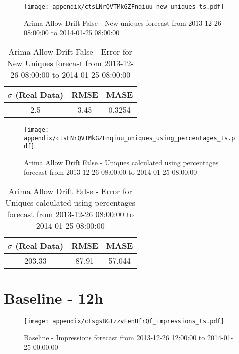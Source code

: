 \begin{figure}[H] \begin{center} \leavevmode
\texttt{[image: appendix/ctsLNrQVTMkGZFnqiuu\_new\_uniques\_ts.pdf]} \caption{
Arima Allow Drift False - New uniques forecast from 2013-12-26 08:00:00 to 2014-01-25 08:00:00} \label{fig:appendix/ctsLNrQVTMkGZFnqiuu_new_uniques_ts.pdf} \end{center}
\end{figure}

\begin{table}[H]
\centering
\footnotesize
\begin{tabular}{ccc}
$\sigma$ (Real Data) & RMSE & MASE   \\ \hline
2.5 & 3.45 & 0.3254 \\
\end{tabular}

\vspace{0.5cm}

\caption{
Arima Allow Drift False - Error for New Uniques forecast from 2013-12-26 08:00:00 to 2014-01-25 08:00:00}
\end{table}

\begin{figure}[H] \begin{center} \leavevmode
\texttt{[image: appendix/ctsLNrQVTMkGZFnqiuu\_uniques\_using\_percentages\_ts.pdf]} \caption{
Arima Allow Drift False - Uniques calculated using percentages forecast from 2013-12-26 08:00:00 to 2014-01-25 08:00:00} \label{fig:appendix/ctsLNrQVTMkGZFnqiuu_uniques_using_percentages_ts.pdf} \end{center}
\end{figure}

\begin{table}[H]
\centering
\footnotesize
\begin{tabular}{ccc}
$\sigma$ (Real Data) & RMSE & MASE   \\ \hline
203.33 & 87.91 & 57.044 \\
\end{tabular}

\vspace{0.5cm}

\caption{
Arima Allow Drift False - Error for Uniques calculated using percentages forecast from 2013-12-26 08:00:00 to 2014-01-25 08:00:00}
\end{table}

\section{Baseline - 12h}
\begin{figure}[H] \begin{center} \leavevmode
\texttt{[image: appendix/ctsgsBGTzzvFenUfrQf\_impressions\_ts.pdf]} \caption{
Baseline - Impressions forecast from 2013-12-26 12:00:00 to 2014-01-25 00:00:00} \label{fig:appendix/ctsgsBGTzzvFenUfrQf_impressions_ts.pdf} \end{center}
\end{figure}

